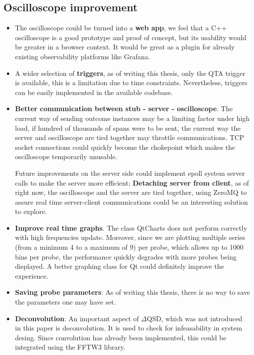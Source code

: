         \subsection{Oscilloscope improvement}
           \begin{itemize}
            
                \item The oscilloscope could be turned into a \textbf{web app}, we feel that a C++ oscilloscope is a good prototype and proof of concept, but its usability would be greater in a browser context. It would be great as a plugin for already existing observability platforms like Grafana.
            
                \item A wider selection of \textbf{triggers}, as of writing this thesis, only the QTA trigger is available, this is a limitation due to time constraints. Nevertheless, triggers can be easily implemented in the available codebase.
            
                \item \textbf{Better communication between stub - server - oscilloscope}. The current way of sending outcome instances may be a limiting factor under high load, if hundred of thousands of spans were to be sent, the current way the server and oscilloscope are tied together may throttle communications. TCP socket connections could quickly become the chokepoint which makes the oscilloscope temporarily unusable.

            Future improvements on the server side could implement epoll system server calls to make the server more efficient; \textbf{Detaching server from client}, as of right now, the oscilloscope and the server are tied together, using ZeroMQ to assure real time server-client communications could be an interesting solution to explore.

                \item \textbf{Improve real time graphs}. The class QtCharts does not perform correctly with high frequencies update. Moreover, since we are plotting multiple series (from a minimum 4 to a maximum of 9) per probe, which allows up to 1000 bins per probe, the performance quickly degrades with more probes being displayed. A better graphing class for Qt could definitely improve the experience.

                \item \textbf{Saving probe parameters}: As of writing this thesis, there is no way to save the parameters one may have set. 
           
                \item \textbf{Deconvolution}: An important aspect of $\Delta$QSD, which was not introduced in this paper is deconvolution. It is used to check for infeasability in system desing. Since convolution has already been implemented, this could be integrated using the FFTW3 library. 


           \end{itemize} 
                
